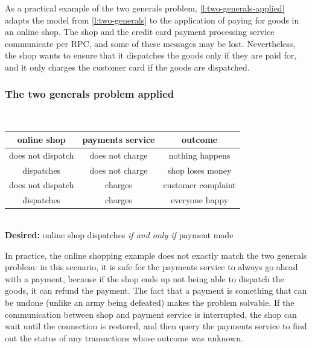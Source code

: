 As a practical example of the two generals problem, \autoref{l:two-generals-applied} adapts the model from \autoref{l:two-generals} to the application of paying for goods in an online shop.
The shop and the credit card payment processing service communicate per RPC, and some of these messages may be lost.
Nevertheless, the shop wants to ensure that it dispatches the goods only if they are paid for, and it only charges the customer card if the goods are dispatched.

\begin{frame}
    \label{s:two-generals-applied}
    \frametitle{The two generals problem applied}
    \begin{center}
        \\[0.5em]\pause
        \renewcommand{\arraystretch}{1.3}
        \begin{tabular}{c|c|c}
            \hline
            \textbf{online shop} & \textbf{payments service} & \textbf{outcome} \\\hline
            does not dispatch & does not charge & nothing happens \\
            dispatches & does not charge & shop loses money \\
            does not dispatch & charges & customer complaint \\
            dispatches & charges & everyone happy \\\hline
        \end{tabular}\\[1em]
        \textbf{Desired:} online shop dispatches \emph{if and only if} payment made
    \end{center}
\end{frame}
\label{l:two-generals-applied}

In practice, the online shopping example does not exactly match the two generals problem: in this scenario, it is safe for the payments service to always go ahead with a payment, because if the shop ends up not being able to dispatch the goods, it can refund the payment.
The fact that a payment is something that can be undone (unlike an army being defeated) makes the problem solvable.
If the communication between shop and payment service is interrupted, the shop can wait until the connection is restored, and then query the payments service to find out the status of any transactions whose outcome was unknown.

